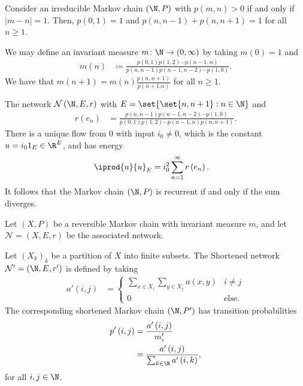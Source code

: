 \documentclass[10pt]{mypackage}
\renewcommand{\coloneq}{\coloneqq}
\begin{document}
\begin{example}
  Consider an irreducible Markov chain $\left( \N,P \right)$ with $p\left( m,n \right) >  0$ if and only if $\left\vert m-n \right\vert = 1$. Then, $p\left( 0,1 \right) = 1$ and $p\left( n,n-1 \right) + p\left( n,n+1 \right) = 1$ for all $n\geq 1$.

  We may define an invariant measure $m\colon \N\to \left( 0,\infty \right)$ by taking $m(0) = 1$ and
  \begin{align*}
    m(n) &\coloneq \frac{p\left( 0,1 \right)p\left( 1,2 \right)\cdots p\left( n-1,n \right)}{p\left( n,n-1 \right)p\left( n-1,n-2 \right)\cdots p\left( 1,0 \right)}.
  \end{align*}
  We have that $m\left( n+1 \right) = m(n)\frac{p\left( n,n+1 \right)}{p\left( n+1.n \right)}$ for all $n\geq 1$.

  The network $\mathcal{N}\left( \N,E,r \right)$ with $E = \set{\set{n,n+1} : n\in \N}$ and
  \begin{align*}
    r\left( e_n \right) &= \frac{p\left( n,n-1 \right)p\left( n-1,n-2 \right)\cdots p\left( 1,0 \right)}{ p\left( 0,1 \right)p\left( 1,2 \right)\cdots p\left( n-1,n \right)p\left( n,n+1 \right) }.
  \end{align*}
  There is a unique flow from $0$ with input $i_0\neq 0$, which is the constant $u = i_01_{E}\in \R^{E}$, and has energy
  \begin{align*}
    \iprod{u}{u}_{E} &= i_0^2\sum_{n=1}^{\infty}r\left( e_n \right).
  \end{align*}
  It follows that the Markov chain $\left( \N,P \right)$ is recurrent if and only if the sum diverges.
\end{example}
\begin{definition}
  Let $\left( X,P \right)$ be a reversible Markov chain with invariant measure $m$, and let $\mathcal{N} = \left( X,E,r \right)$ be the associated network.

  Let $\left( X_k \right)_{k}$ be a partition of $X$ into finite subsets. The Shortened network $\mathcal{N}' = \left( \N,E,r' \right)$ is defined by taking
  \begin{align*}
    a'\left( i,j \right) &= \begin{cases}
      \sum_{x\in X_i}\sum_{y\in X_j}a\left( x,y \right) & i\neq j\\
      0 & \text{else}.
    \end{cases}
  \end{align*}
  The corresponding shortened Markov chain $\left( \N,P' \right)$ has transition probabilities
  \begin{align*}
    p'\left( i,j \right) &= \frac{a'\left( i,j \right)}{m_i'}\\
                         &= \frac{a'\left( i,j \right)}{\sum_{k\in \N}a'\left( i,k \right)},
  \end{align*}
  for all $i,j \in \N$.
\end{definition}
\end{document}
